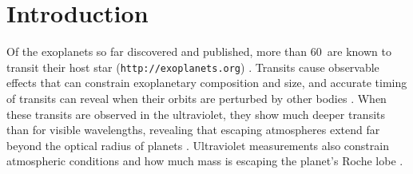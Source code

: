 \documentclass[twocolumn]{emulateapj}
\newcommand{\numt}{60}
\begin{document}


\section{Introduction}
Of the exoplanets so far discovered and published, more than \numt\ are known to
transit their host star (\texttt{http://exoplanets.org}) . Transits cause observable effects that can constrain exoplanetary composition and size, and accurate timing of transits can reveal when their orbits are perturbed by other bodies \citep{winnchap}. When these transits are observed in the ultraviolet, they show much deeper transits than for visible wavelengths, revealing that escaping atmospheres extend far beyond the optical radius of planets \citep{vidmad,benjaf7,mclay,lecav,fossati}. Ultraviolet measurements also constrain atmospheric conditions and how much mass is escaping the planet's Roche lobe \citep{knutsonprop,gmunoz,linsky}.
\end{document}

